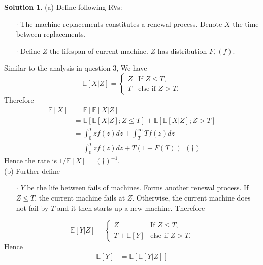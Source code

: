 \documentclass[a4paper, 10pt]{article}
\theoremstyle{definition}
\theoremstyle{hSol}
\newtheorem*{solution}{Solution}
\begin{document}
\begin{solution} (a) Define following RVs:
\begin{itemize}
  \item[$\cdot$] The machine replacements constitutes a renewal process. Denote $X$ the time between replacements.
  \item[$\cdot$] Define $Z$ the lifespan of current machine. $Z$ has distribution $F,(f)$.
\end{itemize}
Similar to the analysis in question 3, We have
\begin{equation}
  \mathbb{E}\left[X|Z\right] = 
    \begin{cases}
      Z & \text{If $Z\leq T$,} \\
      T & \text{else if $Z>T$.}
  \end{cases}
\end{equation}
Therefore
\begin{equation}
  \begin{split}
    \mathbb{E}\left[X\right] &= \mathbb{E}\left[\mathbb{E}\left[X|Z\right]\right] \\
    &=\mathbb{E}\left[\mathbb{E}\left[X|Z\right]; Z\leq T\right] + \mathbb{E}\left[\mathbb{E}\left[X|Z\right]; Z>T\right]\\
    &= \int_0^T z f(z) dz + \int_T^{\infty} T f(z)dz \\
    &= \int_0^T z f(z) dz + T(1-F(T))~~(\dag)
  \end{split}
\end{equation}
Hence the rate is $1/\mathbb{E}\left[X\right]=(\dag)^{-1}$.\\
(b) Further define
\begin{itemize}
  \item[$\cdot$] $Y$ be the life between fails of machines. Forms another renewal process. If $Z\leq T$, the current machine fails at $Z$. Otherwise, the current machine does not fail by $T$ and it then starts up a new machine. Therefore
\end{itemize}
\begin{equation}
  \mathbb{E}\left[Y|Z\right] = 
    \begin{cases}
      Z & \text{If $Z\leq T$,} \\
      T + \mathbb{E}\left[Y\right] & \text{else if $Z>T$.}
  \end{cases}
\end{equation}
Hence
\begin{equation}
  \begin{split}
    \mathbb{E}\left[Y\right] &= \mathbb{E}\left[\mathbb{E}\left[Y|Z\right]\right] \\

\end{split}
\end{equation}
\end{solution}
\end{document}
